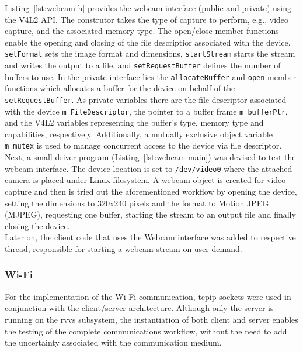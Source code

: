 Listing~\ref{lst:webcam-h} provides the webcam interface (public and private)
using the V4L2 API. The construtor takes the type of capture to perform, e.g.,
video capture, and the associated memory type. The open/close member functions
enable the opening and closing of the file descriptior associated with the
device. \texttt{setFormat} sets the image format and dimensions,
\texttt{startStream} starts the stream and writes the output to a file, and
\texttt{setRequestBuffer} defines the number of buffers to use. In the private
interface lies the \texttt{allocateBuffer} and \texttt{open} member functions which allocates a
buffer for the device on behalf of the \texttt{setRequestBuffer}. As private
variables there are the file descriptor associated with the device
\texttt{m\_FileDescriptor}, the pointer to a buffer frame \texttt{m\_bufferPtr},
and the V4L2 variables representing the buffer's type, memory type and
capabilities, respectively. Additionally, a mutually exclusive object variable
\texttt{m\_mutex} is used to manage concurrent access to the device via file descriptor.\\
%

Next, a small driver program (Listing~\ref{lst:webcam-main}) was devised to test
the webcam interface. The device location is set to \texttt{/dev/video0} where
the attached camera is placed under Linux filesystem. A webcam object is created
for video capture and then is tried out the aforementioned workflow by opening
the device, setting the dimensions to 320x240 pixels and the format to Motion
JPEG (MJPEG), requesting one buffer, starting the stream to an output file and
finally closing the device.\\ 
%

Later on, the client code that uses the Webcam interface was added to
respective thread, responsible for starting a webcam stream on user-demand.
%
\subsubsection{Wi-Fi}%
\label{sec:wi-fi-rvvs-implem}
For the implementation of the Wi-Fi communication, \gls{tcpip} sockets were used
in conjunction with the client/server architecture. Although only the server is
running on the \gls{rvvs} subsystem, the instantiation of both client and server
enables the testing of the complete communications workflow, without the need to
add the uncertainty associated with the communication medium.


